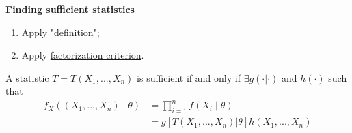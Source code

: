 \documentclass[11pt]{elegantbook}
\begin{document}
\textbf{\underline{Finding sufficient statistics}}
\begin{enumerate}[$\circ$]
    \item Apply "definition";
    \item Apply \underline{factorization criterion}.
\end{enumerate}

\begin{proposition}
    A statistic $T=T(X_1,...,X_n)$ is sufficient \underline{if and only if} $\exists g(\cdot|\cdot)$ and $h(\cdot)$ such that
    \begin{equation}
        \begin{aligned}
            f_X((X_1,...,X_n)\mid \theta)&=\prod_{i=1}^n f(X_i\mid \theta)\\
            &=g[T(X_1,...,X_n)| \theta] h(X_1,...,X_n)
        \end{aligned}
        \nonumber
    \end{equation}
\end{proposition}
\end{document}
